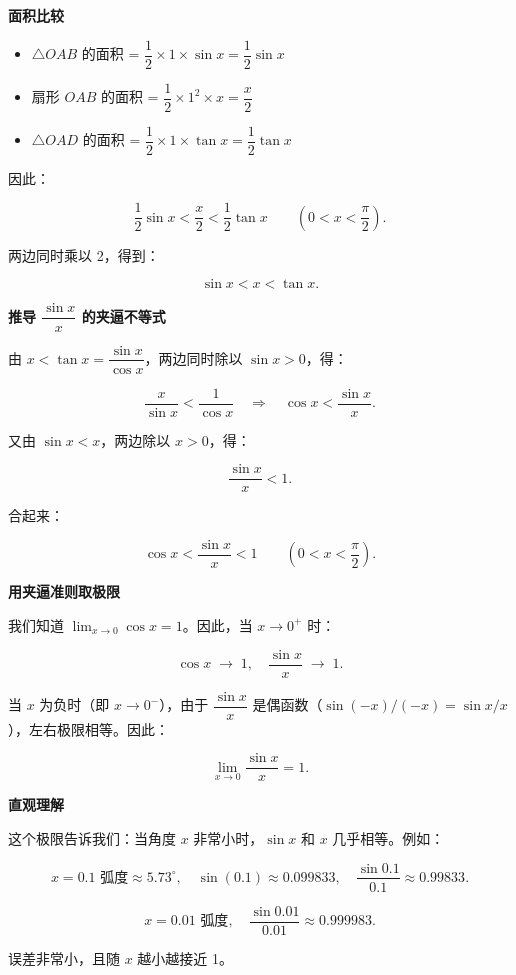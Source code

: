 \documentclass{ctexart}
\newenvironment{custom}[1]{\par\noindent \textbf{#1}\quad}{\par\vspace{1em}}
\begin{document}
\begin{custom}{面积比较}

\begin{itemize}
\item \(\triangle OAB\) 的面积 = \(\dfrac{1}{2} \times 1 \times \sin x = \dfrac{1}{2} \sin x\)
\item 扇形 \(OAB\) 的面积 = \(\dfrac{1}{2} \times 1^2 \times x = \dfrac{x}{2}\)
\item \(\triangle OAD\) 的面积 = \(\dfrac{1}{2} \times 1 \times \tan x = \dfrac{1}{2} \tan x\)
\end{itemize}

因此：

\[
\dfrac{1}{2} \sin x  <  \dfrac{x}{2} < \dfrac{1}{2} \tan x \qquad (0 < x < \dfrac{\pi}{2}).
\]

两边同时乘以 2，得到：

\[
\sin x  < x < \tan x.
\]

\end{custom}

\begin{custom}{推导 \(\dfrac{\sin x}{x}\) 的夹逼不等式}

由 \(x < \tan x = \dfrac{\sin x}{\cos x}\)，两边同时除以 \(\sin x > 0\)，得：

\[
\dfrac{x}{\sin x} < \dfrac{1}{\cos x} \quad \Longrightarrow \quad \cos x < \dfrac{\sin x}{x}.
\]

又由 \(\sin x < x\)，两边除以 \(x > 0\)，得：

\[
\dfrac{\sin x}{x} < 1.
\]

合起来：

\[
\cos x < \dfrac{\sin x}{x} < 1 \qquad (0 < x < \dfrac{\pi}{2}).
\]

\end{custom}

\begin{custom}{用夹逼准则取极限}

我们知道 \(\lim_{x \to 0} \cos x = 1\)。因此，当 \(x \to 0^+\) 时：

\[
\cos x \;\longrightarrow\; 1,\quad \dfrac{\sin x}{x} \;\longrightarrow\; 1.
\]

当 \(x\) 为负时（即 \(x \to 0^-\)），由于 \(\dfrac{\sin x}{x}\) 是偶函数（\(\sin(-x)/(-x) = \sin x / x\)），左右极限相等。因此：

\[
\lim_{x \to 0} \dfrac{\sin x}{x} = 1.
\]

\end{custom}

\begin{custom}{直观理解}

这个极限告诉我们：当角度 \(x\) 非常小时，\(\sin x\) 和 \(x\) 几乎相等。例如：

\[
x = 0.1 \text{ 弧度} \approx 5.73^\circ,\quad \sin(0.1) \approx 0.099833,\quad \dfrac{\sin 0.1}{0.1} \approx 0.99833.
\]

\[
x = 0.01 \text{ 弧度},\quad \dfrac{\sin 0.01}{0.01} \approx 0.999983.
\]

误差非常小，且随 \(x\) 越小越接近 1。

\end{custom}
\end{document}

